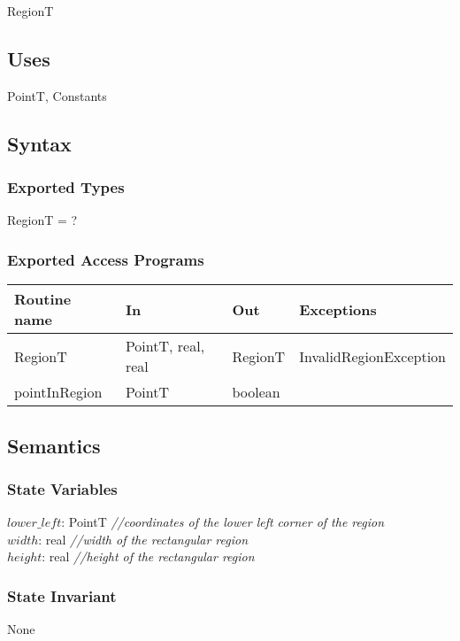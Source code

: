 \documentclass[12pt]{article}
\begin{document}
RegionT

\subsection* {Uses}

PointT, Constants

\subsection* {Syntax}

\subsubsection* {Exported Types}

RegionT = ?

\subsubsection* {Exported Access Programs}

\begin{tabular}{| l | l | l | l |}
\hline
\textbf{Routine name} & \textbf{In} & \textbf{Out} & \textbf{Exceptions}\\
\hline
RegionT & PointT, real, real & RegionT & InvalidRegionException\\
\hline
pointInRegion & PointT & boolean & ~\\
\hline 
\end{tabular}

\subsection* {Semantics}

\subsubsection* {State Variables}

$\mathit{lower\_left}$: PointT {\it //coordinates of the lower left corner of the region}\\
$\mathit{width}$: real {\it //width of the rectangular region}\\
$\mathit{height}$: real {\it //height of the rectangular region}

\subsubsection* {State Invariant}
None
\end{document}
